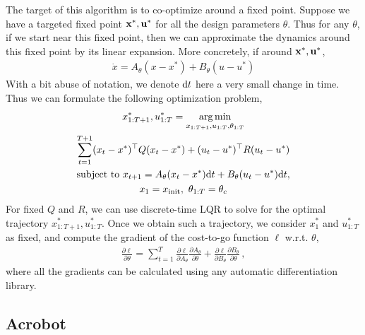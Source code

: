 \documentclass[conference]{IEEEtran}
\begin{document}
The target of this algorithm is to co-optimize around a fixed point. Suppose we have a targeted fixed point $\mathbf{x}^*, \mathbf{u}^*$ for all the design parameters $\theta$. Thus for any $\theta$, if we start near this fixed point, then we can approximate the dynamics around this fixed point by its linear expansion. More concretely, if around $\mathbf{x}^*, \mathbf{u}^*$, 
\begin{align*}
\dot{x} = A_{\theta}(x - x^*) + B_{\theta}(u-u^*)
\end{align*}
With a bit abuse of notation, we denote $\textnormal{d} t$ here a very small change in time. Thus we can formulate the following optimization problem, 
\begin{gather*}
    x_{1:T+1}^*, u_{1:T}^*= \operatorname*{arg\,min}\limits_{x_{1:T+1},u_{1:T},\theta_{1:T}} \\
    \sum\limits_{t=1}^{T+1} (x_t - x^*)^\top  Q (x_t-x^*) + (u_t-u^*)^\top R (u_t-u^*) \\
    \text{subject to~} x_{t+1} = A_{\theta}(x_t - x^*)\textnormal{d} t + B_{\theta}(u_t-u^*)\textnormal{d} t, \\
    x_1 = x_{\text{init}},~\theta_{1:T} = \theta_c
\end{gather*}
For fixed $Q$ and $R$, we can use discrete-time LQR to solve for the optimal trajectory $x_{1:T+1}^*, u_{1:T}^*$. Once we obtain such a trajectory, we consider $x^*_1$ and $u_{1:T}^*$ as fixed, and compute the gradient of the cost-to-go function $\ell$ w.r.t. $\theta$,
\begin{align*}
\frac{\partial \ell}{\partial \theta} = \sum\limits_{t=1}^{T} \frac{\partial \ell}{\partial A_{\theta}} \frac{\partial A_{\theta}}{\partial \theta}  + \frac{\partial \ell}{\partial B_{\theta}} \frac{\partial B_{\theta}}{\partial \theta}\,, 
\end{align*}
where all the gradients can be calculated using any automatic differentiation library.




\subsection{Acrobot}
\end{document}
